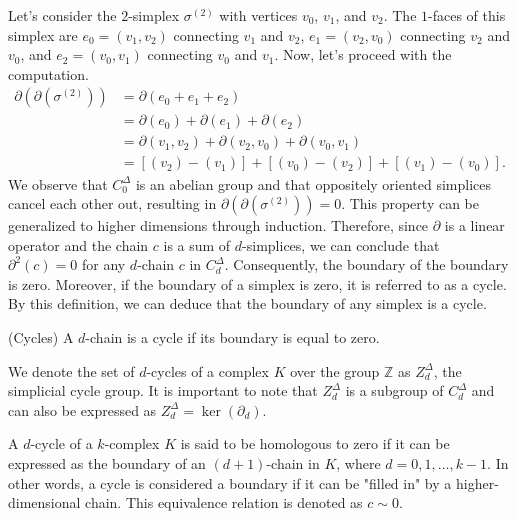 \begin{example}
	Let's consider the $2$-simplex $\sigma^{(2)}$ with vertices $v_{0}$, $v_{1}$, and
	$v_{2}$. The $1$-faces of this simplex are $e_{0} = (v_{1},v_{2})$ connecting
	$v_{1}$ and $v_{2}$, $e_{1} = (v_{2},v_{0})$ connecting $v_{2}$ and $v_{0}$,
	and $e_{2} = (v_{0},v_{1})$ connecting $v_{0}$ and $v_{1}$. Now, let's proceed
	with the computation.
	\begin{align}
		\partial(\partial(\sigma^{(2)})) & = \partial (e_{0}+e_{1}+e_{2})                                          \\
		                                 & = \partial(e_{0}) + \partial(e_{1}) + \partial(e_{2})                   \\
		                                 & = \partial(v_{1},v_{2}) + \partial(v_{2},v_{0}) + \partial(v_{0},v_{1}) \\
		                                 & = [(v_{2})-(v_{1})] + [(v_{0})-(v_{2})]+[(v_{1})-(v_{0})].
	\end{align}
	We observe that $C^{\Delta}_{0}$ is an abelian group and that oppositely oriented
	simplices cancel each other out, resulting in
	$\partial(\partial(\sigma^{(2)})) = 0$. This property can be generalized to higher
	dimensions through induction. Therefore, since $\partial$ is a linear operator
	and the chain $c$ is a sum of $d$-simplices, we can conclude that
	$\partial^{2}(c) = 0$ for any $d$-chain $c$ in $C^{\Delta}_{d}$. Consequently,
	the boundary of the boundary is zero. Moreover, if the boundary of a simplex
	is zero, it is referred to as a cycle. By this definition, we can deduce that the
	boundary of any simplex is a cycle.
\end{example}

\begin{definition}
	{(Cycles) \cite[p.106]{hatcher2005algebraic}} A $d$-chain is a cycle if its boundary
	is equal to zero.
\end{definition}

We denote the set of $d$-cycles of a complex $K$ over the group $\mathbb{Z}$ as
$Z^{\Delta}_{d}$, the simplicial cycle group. It is important to note that
$Z^{\Delta}_{d}$ is a subgroup of $C^{\Delta}_{d}$ and can also be expressed as
$Z^{\Delta}_{d} = \ker(\partial_{d})$.

A $d$-cycle of a $k$-complex $K$ is said to be homologous to zero if it can be
expressed as the boundary of an $(d+1)$-chain in $K$, where $d=0,1,\ldots,k-1$.
In other words, a cycle is considered a boundary if it can be "filled in" by a higher-dimensional
chain. This equivalence relation is denoted as $c \sim 0$.

